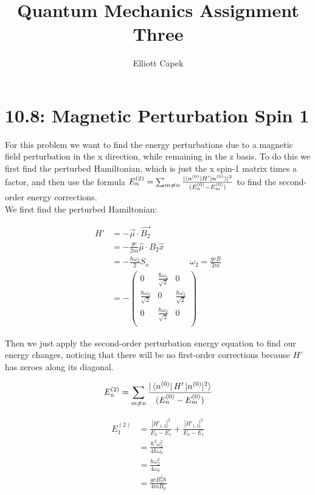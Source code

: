 \documentclass[10pt]{article} %
\title{Quantum Mechanics Assignment Three}
\author{Elliott Capek}
\begin{document}
\maketitle{}

\section{10.8: Magnetic Perturbation Spin 1}
For this problem we want to find the energy perturbations due to a magnetic field perturbation
in the x direction, while remaining in the z basis. To do this we first find the
perturbed Hamiltonian, which is just the x spin-1 matrix times a factor, and
then use the formula
$E_n^{(2)} = \sum_{m\neq n}\frac{|\bra{n^{(0)}}H'\ket{n^{(0)}}|^2}{(E_n^{(0)}-E_m^{(0)})}$
to find the second-order energy corrections.\\

We first find the perturbed Hamiltonian:

\begin{align*}
  H' &= -\vec{\mu} \cdot \vec{B_2}\\
  &= -\frac{g e}{2m} \hat{\mu} \cdot B_2 \hat{x}\\
  &= -\frac{\hbar\omega_2}{2} S_x
  \hspace{2cm}\omega_2 = \frac{geB}{2m}\\
  &=
  -\begin{pmatrix}
    0 & \frac{\hbar\omega_2}{\sqrt{2}} & 0\\
    \frac{\hbar\omega_2}{\sqrt{2}} & 0 & \frac{\hbar\omega_2}{\sqrt{2}}\\
    0 & \frac{\hbar\omega_2}{\sqrt{2}} & 0\\
  \end{pmatrix}
\end{align*}

Then we just apply the second-order perturbation energy equation to find our
energy changes, noticing that there will be no first-order corrections because
$H'$ has zeroes along its diagonal.

\begin{align*}
  E_n^{(2)} = \sum_{m\neq n}\frac{|\bra{n^{(0)}}H'\ket{n^{(0)}|^2}}{(E_n^{(0)}-E_m^{(0)})}
\end{align*}

\begin{align*}
  E_1^{(2)} &=
  \frac{|H'_{1,2}|^2}{E_2 - E_1} +
  \frac{|H'_{1,3}|^2}{E_{3} - E_{1}}\\
  &= \frac{\hbar^2\omega_2^2}{4\hbar\omega_0}\\
  &= \frac{\hbar\omega_2^2}{4\omega_0}\\
  &= \frac{geB_2^2\hbar}{4mB_0}
\end{align*}
\end{document}
